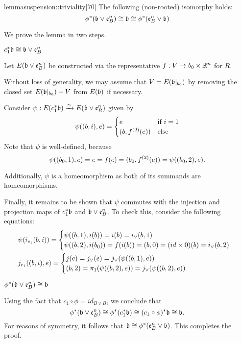 \begin{mystatement}{lemma}{suspension::triviality}[70]
    The following (non-rooted) isomorphy holds:
    \[ \ind{\phi}(\bb \vee \be{B}) \cong \bb \cong \ind{\phi}(\be{B} \vee \bb) \]
\end{mystatement}

\begin{myproof}
    We prove the lemma in two steps.
    \begin{steps}
        \item $\ind{c_1}\bb \cong \bb \vee \be{B}$
        
        Let $E(\bb \vee \be{B})$ be constructed via 
        the representative $f: V \to b_0 \cross \R^n$ for $R$.

        Without loss of generality, we may assume that
        $V = E(\bbb)$ by removing the closed set $E(\bbb) - V$ from $E(\bb)$ if necessary.

        Consider $\psi: E(\ind{c_1}\bb) \isomto E(\bb \vee \be{B})$ given by
        \[ \psi((b, i), e) = \case{e}{(b, \snd{f}(e))}{i = 1} \]
        Note that $\psi$ is well-defined, because
        \[ \psi((b_0, 1), e) = e = f(e) = (b_0, \snd{f}(e)) = \psi((b_0, 2), e). \]

        Additionally, $\psi$ is a homeomorphism as both of its summands are homeomorphisms.

        Finally, it remains to be shown that $\psi$
        commutes with the injection and projection maps of $\ind{c_1}\bb$ and $\bb \vee \be{B}$.
        To check this, consider the following equations:
        \begin{align}
            &\psi(i_{c_1}(b, i)) = \casenif{\psi((b, 1), i(b)) = i(b) = i_\vee(b, 1)}{\psi((b, 2), i(b_0)) = f(i(b)) = (b, 0) = (id \cross 0)(b) = i_\vee(b, 2)} \\
            &j_{c_1}((b, i), e) = \casenif{j(e) = j_\vee(e) = j_\vee(\psi((b, 1), e))}{(b, 2) = \pi_1(\psi((b, 2), e)) = j_\vee(\psi((b, 2), e))}
        \end{align}
        
        \item $\ind{\phi}(\bb \vee \be{B}) \cong \bb$

        Using the fact that $c_1 \circ \phi = id_{B \vee B}$, we conclude that
        \[ \ind{\phi}(\bb \vee \be{B}) \cong \ind{\phi}(\ind{c_1}\bb) \cong \ind{(c_1 \circ \phi)}\bb \cong \bb. \]
        For reasons of symmetry, it follows that $\bb \cong \ind{\phi}(\be{B} \vee \bb)$.
        This completes the proof.
    \end{steps}
\end{myproof}
